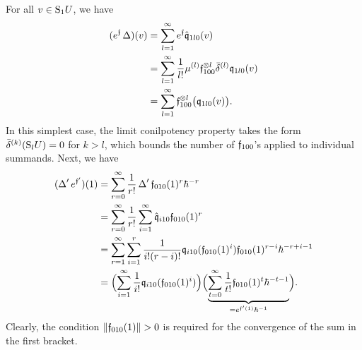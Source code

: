 \documentclass[\MainFolder/Text.tex]{subfiles}
\begin{document}
\begin{Example}
For all $v\in\mathrm{S}_1 U$, we have
\begin{equation}\label{Eq:BubbleI}
\begin{aligned}
 (e^{\mathfrak{f}}\operatorname{\Delta})(v) &= \sum_{l=1}^\infty e^{\mathfrak{f}}\hat{\mathfrak{q}}_{1l0}(v) \\
 & = \sum_{l=1}^\infty \frac{1}{l!} \mu^{(l)}\mathfrak{f}_{100}^{\otimes l}\bar{\delta}^{(l)}\mathfrak{q}_{1l0}(v)\\ 
 & = \sum_{l=1}^\infty \mathfrak{f}_{100}^{\otimes l}\bigl(\mathfrak{q}_{1l0}(v)\bigr).
\end{aligned}
\end{equation}
In this simplest case, the limit conilpotency property takes the form $\bar{\delta}^{(k)}(\mathrm{S}_l U) = 0$ for $k>l$, which bounds the number of $\mathfrak{f}_{100}$'s applied to individual summands.
Next, we have
\begin{equation}\label{Eq:BubbleII}
\begin{aligned}
(\operatorname{\Delta}' e^{\mathfrak{f}'})(1) & = \sum_{r=0}^\infty \frac{1}{r!} \operatorname{\Delta}'\mathfrak{f}_{010}(1)^r\hbar^{-r} \\
& = \sum_{r=0}^\infty \frac{1}{r!} \sum_{i=1}^\infty \hat{\mathfrak{q}}_{i10} \mathfrak{f}_{010}(1)^r \\
& = \sum_{r=1}^\infty\sum_{i=1}^r \frac{1}{i!(r-i)!} \mathfrak{q}_{i10}(\mathfrak{f}_{010}(1)^i)\mathfrak{f}_{010}(1)^{r-i} \hbar^{-r + i - 1} \\
& = \Bigl(\sum_{i=1}^\infty\frac{1}{i!}\mathfrak{q}_{i10}(\mathfrak{f}_{010}(1)^i)\Bigr)\Bigl(\underbrace{\sum_{t=0}^\infty\frac{1}{t!}\mathfrak{f}_{010}(1)^t \hbar^{-t-1}}_{=e^{\mathfrak{f}'(1)}\hbar^{-1}}\Bigr).
\end{aligned}
\end{equation}
Clearly, the condition $\Norm{\HTP_{010}(1)}>0$ is required for the convergence of the sum in the first bracket.
\end{Example}
\end{document}
